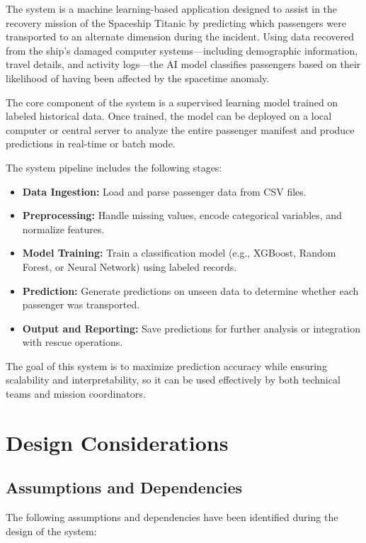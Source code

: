 \documentclass[15pt]{article}
\begin{document}
The system is a machine learning-based application designed to assist in the recovery mission of the Spaceship Titanic by predicting which passengers were transported to an alternate dimension during the incident. Using data recovered from the ship's damaged computer systems—including demographic information, travel details, and activity logs—the AI model classifies passengers based on their likelihood of having been affected by the spacetime anomaly.

The core component of the system is a supervised learning model trained on labeled historical data. Once trained, the model can be deployed on a local computer or central server to analyze the entire passenger manifest and produce predictions in real-time or batch mode. 

The system pipeline includes the following stages:
\begin{itemize}
    \item \textbf{Data Ingestion:} Load and parse passenger data from CSV files.
    \item \textbf{Preprocessing:} Handle missing values, encode categorical variables, and normalize features.
    \item \textbf{Model Training:} Train a classification model (e.g., XGBoost, Random Forest, or Neural Network) using labeled records.
    \item \textbf{Prediction:} Generate predictions on unseen data to determine whether each passenger was transported.
    \item \textbf{Output and Reporting:} Save predictions for further analysis or integration with rescue operations.
\end{itemize}

The goal of this system is to maximize prediction accuracy while ensuring scalability and interpretability, so it can be used effectively by both technical teams and mission coordinators.

\section{Design Considerations}
\subsection{Assumptions and Dependencies}
The following assumptions and dependencies have been identified during the design of the system:
\end{document}
